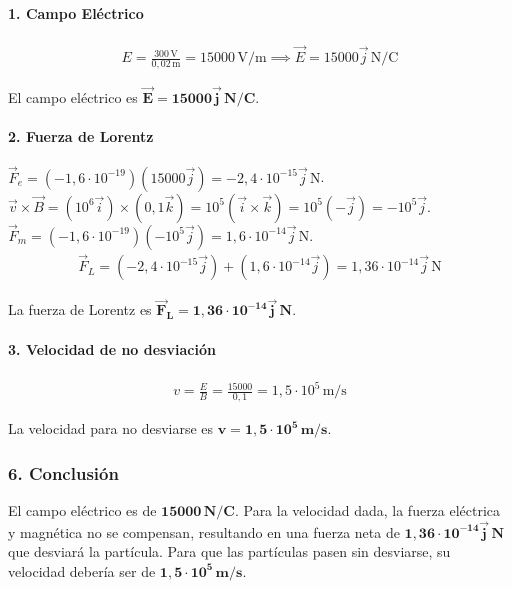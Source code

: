 \paragraph*{1. Campo Eléctrico}
\begin{gather}
    E = \frac{300 \, \text{V}}{0,02 \, \text{m}} = 15000 \, \text{V/m} \implies \vec{E} = 15000\vec{j} \, \text{N/C}
\end{gather}
\begin{cajaresultado}
    El campo eléctrico es $\boldsymbol{\vec{E} = 15000\vec{j} \, N/C}$.
\end{cajaresultado}
\paragraph*{2. Fuerza de Lorentz}
$\vec{F}_e = (-1,6\cdot10^{-19})(15000\vec{j}) = -2,4\cdot10^{-15}\vec{j} \, \text{N}$.
$\vec{v} \times \vec{B} = (10^6\vec{i}) \times (0,1\vec{k}) = 10^5 (\vec{i} \times \vec{k}) = 10^5 (-\vec{j}) = -10^5\vec{j}$.
$\vec{F}_m = (-1,6\cdot10^{-19})(-10^5\vec{j}) = 1,6\cdot10^{-14}\vec{j} \, \text{N}$.
\begin{gather}
    \vec{F}_L = (-2,4\cdot10^{-15}\vec{j}) + (1,6\cdot10^{-14}\vec{j}) = 1,36\cdot10^{-14}\vec{j} \, \text{N}
\end{gather}
\begin{cajaresultado}
    La fuerza de Lorentz es $\boldsymbol{\vec{F}_L = 1,36\cdot10^{-14}\vec{j} \, N}$.
\end{cajaresultado}
\paragraph*{3. Velocidad de no desviación}
\begin{gather}
    v = \frac{E}{B} = \frac{15000}{0,1} = 1,5 \cdot 10^5 \, \text{m/s}
\end{gather}
\begin{cajaresultado}
    La velocidad para no desviarse es $\boldsymbol{v = 1,5 \cdot 10^5 \, m/s}$.
\end{cajaresultado}

\subsubsection*{6. Conclusión}
\begin{cajaconclusion}
    El campo eléctrico es de $\mathbf{15000 \, N/C}$. Para la velocidad dada, la fuerza eléctrica y magnética no se compensan, resultando en una fuerza neta de $\mathbf{1,36\cdot10^{-14}\vec{j} \, N}$ que desviará la partícula. Para que las partículas pasen sin desviarse, su velocidad debería ser de $\mathbf{1,5 \cdot 10^5 \, m/s}$.
\end{cajaconclusion}


